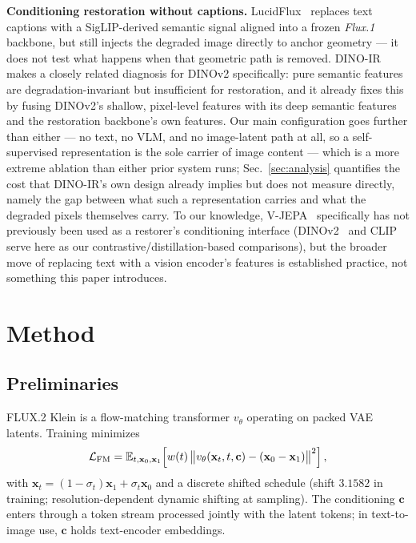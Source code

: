 \documentclass{article}
\def\x{{\mathbf x}}
\def\L{{\cal L}}
\begin{document}
\textbf{Conditioning restoration without captions.} LucidFlux~\cite{lucidflux2025} replaces text captions with a SigLIP-derived semantic signal aligned into a frozen \emph{Flux.1} backbone, but still injects the degraded image directly to anchor geometry — it does not test what happens when that geometric path is removed. DINO-IR~\cite{dinoir2024} makes a closely related diagnosis for DINOv2 specifically: pure semantic features are degradation-invariant but insufficient for restoration, and it already fixes this by fusing DINOv2's shallow, pixel-level features with its deep semantic features and the restoration backbone's own features. Our main configuration goes further than either — no text, no VLM, and no image-latent path at all, so a self-supervised representation is the sole carrier of image content — which is a more extreme ablation than either prior system runs; Sec.~\ref{sec:analysis} quantifies the cost that DINO-IR's own design already implies but does not measure directly, namely the gap between what such a representation carries and what the degraded pixels themselves carry. To our knowledge, V-JEPA~\cite{assran2023self,bardes2025vjepa2} specifically has not previously been used as a restorer's conditioning interface (DINOv2~\cite{oquab2023dinov2} and CLIP~\cite{radford2021learning} serve here as our contrastive/distillation-based comparisons), but the broader move of replacing text with a vision encoder's features is established practice, not something this paper introduces.

\section{Method}
\label{sec:method}

\subsection{Preliminaries}
FLUX.2 Klein is a flow-matching transformer $v_\theta$ operating on packed VAE latents. Training minimizes
\begin{equation}
\L_{\mathrm{FM}} = \mathbb{E}_{t,\x_0,\x_1}\!\left[ w(t)\, \big\| v_\theta(\x_t, t, \mathbf{c}) - (\x_0 - \x_1) \big\|^2 \right],
\label{eq:fm}
\end{equation}
with $\x_t=(1-\sigma_t)\x_1+\sigma_t\x_0$ and a discrete shifted schedule (shift $3.1582$ in training; resolution-dependent dynamic shifting at sampling). The conditioning $\mathbf{c}$ enters through a token stream processed jointly with the latent tokens; in text-to-image use, $\mathbf{c}$ holds text-encoder embeddings.
\end{document}

